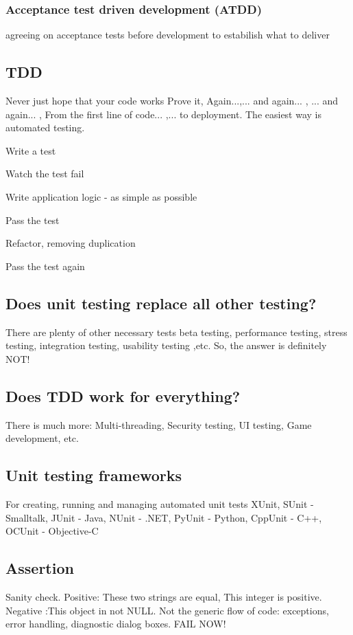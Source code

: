 \documentclass[a4paper,14pt, twocolumn]{extarticle}
\begin{document}
			\subsubsection{Acceptance test driven development (ATDD)}
				agreeing on acceptance tests before development to estabilish what to deliver
		\subsection{TDD}
			Never just hope that your code works
			Prove it, Again...,... and again... , ... and again... , From the first line of code... ,... to deployment.
			The easiest way is automated testing.
			\begin{compactitem}
				\item Write a test 
				\item Watch the test fail 
				\item Write application logic - as simple as possible 
				\item Pass the test 
				\item Refactor, removing duplication 
				\item Pass the test again
			\end{compactitem}
		\subsection{Does unit testing replace all other testing?}
			There are plenty of other necessary tests 
			beta testing, performance testing, stress testing, integration testing, usability testing ,etc. So, the answer is definitely NOT!
		\subsection{Does TDD work for everything?}
			There is much more: Multi-threading, Security testing, UI testing, Game development, etc.
		\subsection{Unit testing frameworks}
			For creating, running and managing automated unit tests
			XUnit, SUnit - Smalltalk, JUnit - Java, NUnit - .NET, PyUnit - Python, CppUnit - C++, OCUnit - Objective-C
		\subsection{Assertion}
		Sanity check. Positive: These two strings are equal, This integer is positive. Negative :This object in not NULL. Not the generic flow of code: exceptions, error handling, diagnostic dialog boxes. FAIL NOW!
\end{document}
